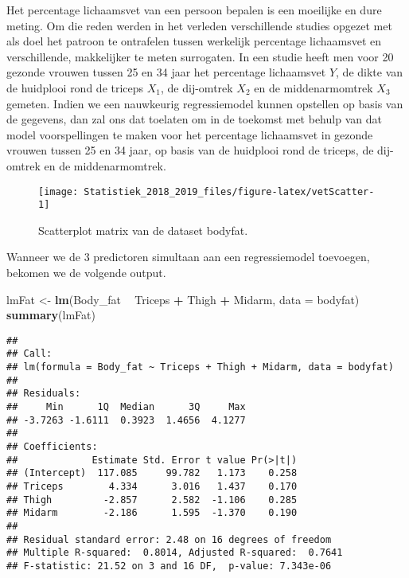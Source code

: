 \documentclass[12pt,dutch,coursenotes]{book}
\newenvironment{Shaded}{\begin{snugshade}}{\end{snugshade}}
\newcommand{\KeywordTok}[1]{\textcolor[rgb]{0.13,0.29,0.53}{\textbf{#1}}}
\newcommand{\DataTypeTok}[1]{\textcolor[rgb]{0.13,0.29,0.53}{#1}}
\newcommand{\StringTok}[1]{\textcolor[rgb]{0.31,0.60,0.02}{#1}}
\newcommand{\OperatorTok}[1]{\textcolor[rgb]{0.81,0.36,0.00}{\textbf{#1}}}
\newcommand{\NormalTok}[1]{#1}
\theoremstyle{definition}
\theoremstyle{definition}
\theoremstyle{definition}
\theoremstyle{remark}
\begin{document}
Het percentage lichaamsvet van een persoon bepalen is een moeilijke en
dure meting. Om die reden werden in het verleden verschillende studies
opgezet met als doel het patroon te ontrafelen tussen werkelijk
percentage lichaamsvet en verschillende, makkelijker te meten
surrogaten. In een studie heeft men voor 20 gezonde vrouwen tussen 25 en
34 jaar het percentage lichaamsvet \(Y\), de dikte van de huidplooi rond
de triceps \(X_1\), de dij-omtrek \(X_2\) en de middenarmomtrek \(X_3\)
gemeten. Indien we een nauwkeurig regressiemodel kunnen opstellen op
basis van de gegevens, dan zal ons dat toelaten om in de toekomst met
behulp van dat model voorspellingen te maken voor het percentage
lichaamsvet in gezonde vrouwen tussen 25 en 34 jaar, op basis van de
huidplooi rond de triceps, de dij-omtrek en de middenarmomtrek.

\begin{figure}

{\centering \texttt{[image: Statistiek\_2018\_2019\_files/figure-latex/vetScatter-1]} 

}

\caption{Scatterplot matrix van de dataset bodyfat.}\label{fig:vetScatter}
\end{figure}

Wanneer we de 3 predictoren simultaan aan een regressiemodel toevoegen,
bekomen we de volgende output.

\begin{Shaded}
\begin{Highlighting}[]
\NormalTok{lmFat <-}\StringTok{ }\KeywordTok{lm}\NormalTok{(Body_fat }\OperatorTok{~}\StringTok{ }\NormalTok{Triceps }\OperatorTok{+}\StringTok{ }\NormalTok{Thigh }\OperatorTok{+}\StringTok{ }\NormalTok{Midarm, }\DataTypeTok{data =}\NormalTok{ bodyfat)}
\KeywordTok{summary}\NormalTok{(lmFat)}
\end{Highlighting}
\end{Shaded}

\begin{verbatim}
## 
## Call:
## lm(formula = Body_fat ~ Triceps + Thigh + Midarm, data = bodyfat)
## 
## Residuals:
##     Min      1Q  Median      3Q     Max 
## -3.7263 -1.6111  0.3923  1.4656  4.1277 
## 
## Coefficients:
##             Estimate Std. Error t value Pr(>|t|)
## (Intercept)  117.085     99.782   1.173    0.258
## Triceps        4.334      3.016   1.437    0.170
## Thigh         -2.857      2.582  -1.106    0.285
## Midarm        -2.186      1.595  -1.370    0.190
## 
## Residual standard error: 2.48 on 16 degrees of freedom
## Multiple R-squared:  0.8014, Adjusted R-squared:  0.7641 
## F-statistic: 21.52 on 3 and 16 DF,  p-value: 7.343e-06
\end{verbatim}
\end{document}
